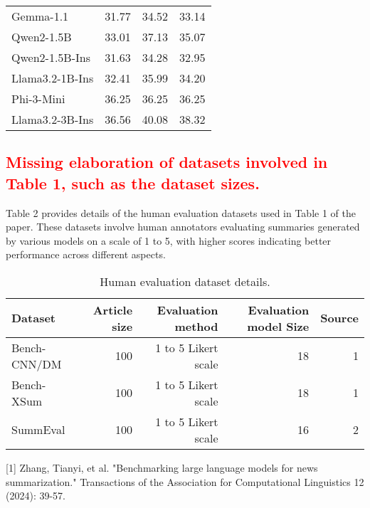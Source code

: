 \documentclass[a4paper]{article}
\begin{document}
\begin{table}[h]
\begin{tabular}{lccc}
Gemma-1.1            & 31.77                       & 34.52                      & 33.14                       \\
Qwen2-1.5B           & 33.01                       & 37.13                      & 35.07                       \\
Qwen2-1.5B-Ins       & 31.63                       & 34.28                      & 32.95                       \\
Llama3.2-1B-Ins      & 32.41                       & 35.99                      & 34.20                       \\
Phi-3-Mini           & 36.25                       & 36.25                      & 36.25                       \\
Llama3.2-3B-Ins      & 36.56                       & 40.08                      & 38.32    \\          
\hline
\end{tabular}
\end{table}




\subsection{\textcolor{red}{Missing elaboration of datasets involved in Table 1, such as the dataset sizes.}}
Table 2 provides details of the human evaluation datasets used in Table 1 of the paper. These datasets involve human annotators evaluating summaries generated by various models on a scale of 1 to 5, with higher scores indicating better performance across different aspects.


\begin{table}[h]
\centering
\caption{Human evaluation dataset details.}
\label{tab:my-table}
\begin{tabular}{lrrrr}
\hline
Dataset       & {Article size} & Evaluation method   & Evaluation model Size & Source \\ \hline
Bench- CNN/DM & {100}          & 1 to 5 Likert scale & 18                    & 1      \\
Bench- XSum   & {100}          & 1 to 5 Likert scale & 18                    & 1      \\
SummEval      & {100}          & 1 to 5 Likert scale & 16                    & 2      \\ \hline
\end{tabular}
\end{table}

[1] Zhang, Tianyi, et al. "Benchmarking large language models for news summarization." Transactions of the Association for Computational Linguistics 12 (2024): 39-57.
\end{document}
